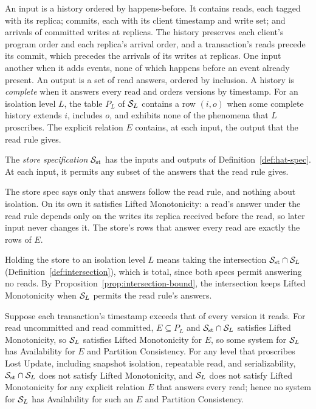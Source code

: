 \begin{definition}
\label{def:hat-spec}
An input is a history ordered by happens-before.  It contains reads, each
tagged with its replica; commits, each with its client timestamp and write set; and arrivals
of committed writes at replicas.  The history preserves
each client's program order and each replica's arrival order, and a
transaction's reads precede its commit, which precedes the arrivals of its
writes at replicas.
One input \inrel another when it adds events, none of which happens before an
event already present.  An output is a set of read
answers, ordered by inclusion.  A history is \emph{complete} when it answers
every read and orders versions by timestamp.  For an isolation level $L$, the
table $P_L$ of $\mathcal{S}_L$ contains a row $(i,o)$ when some complete history
extends $i$, includes $o$, and exhibits none of the phenomena that $L$
proscribes.  The explicit relation $E$ contains, at each input, the output that
the read rule gives.
\end{definition}

\begin{definition}
\label{def:store-spec}
The \emph{store specification} $\mathcal{S}_{\mathrm{st}}$ has the inputs and outputs
of Definition~\ref{def:hat-spec}.  At each input, it permits any subset of the
answers that the read rule gives.
\end{definition}

The store spec says only that answers follow the read rule, and nothing about
isolation.  On its own it satisfies Lifted Monotonicity: a read's answer under the read rule depends only on the writes its replica received
before the read, so later input never changes it.  The store's rows that answer
every read are exactly the rows of $E$.

Holding the store to an isolation level $L$ means taking the intersection
$\mathcal{S}_{\mathrm{st}}\cap\mathcal{S}_L$ (Definition~\ref{def:intersection}), which
is total, since both specs permit
answering no reads.  By Proposition~\ref{prop:intersection-bound}, the
intersection keeps Lifted Monotonicity when $\mathcal{S}_L$ permits the read rule's
answers.

\begin{theorem}
\label{thm:hat-levels}
Suppose each transaction's timestamp exceeds that of every version it reads.
For read uncommitted and read committed, $E\subseteq P_L$ and
$\mathcal{S}_{\mathrm{st}}\cap\mathcal{S}_L$ satisfies Lifted Monotonicity, so $\mathcal{S}_L$
satisfies Lifted Monotonicity for $E$, so some system for $\mathcal{S}_L$ has
Availability for $E$ and Partition Consistency.  For any level that proscribes
Lost Update, including snapshot isolation, repeatable read, and
serializability, $\mathcal{S}_{\mathrm{st}}\cap\mathcal{S}_L$ does not satisfy Lifted
Monotonicity, and $\mathcal{S}_L$ does not satisfy Lifted Monotonicity for any
explicit relation $E$ that answers every read; hence no system for $\mathcal{S}_L$
has Availability for such an $E$ and Partition Consistency.
\end{theorem}

